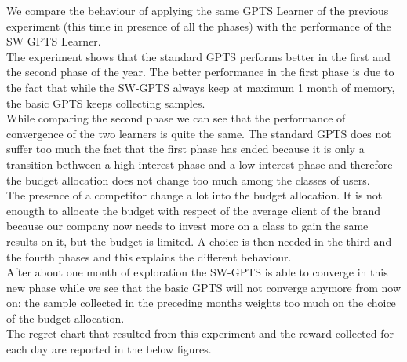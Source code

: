 We compare the behaviour of applying the same GPTS Learner of the previous experiment (this time in presence of all the phases) with the performance of the SW GPTS Learner.
\\The experiment shows that the standard GPTS performs better in the first and the second phase of the year.  The better performance in the first phase is due to the fact that while the SW-GPTS always keep at maximum 1 month of memory, the basic GPTS keeps collecting samples. 
\\While comparing the second phase we can see that the performance of convergence of the two learners is quite the same. The standard GPTS does not suffer too much the fact that the first phase has ended because it is only a transition bethween a high interest phase and a low interest phase and therefore the budget allocation does not change too much among the classes of users.
\\The presence of a competitor change a lot into the budget allocation. It is not enougth to allocate the budget with respect of the average client of the brand because our company now needs to invest more on a class to gain the same results on it, but the budget is limited. A choice is then needed in the third and the fourth phases and this explains the different behaviour. 
\\After about one month of exploration the SW-GPTS is able to converge in this new phase while we see that the basic GPTS will not converge anymore from now on: the sample collected in the preceding months weights too much on the choice of the budget allocation.
\\The regret chart that resulted from this experiment and the reward collected for each day are reported in the below figures.\\
